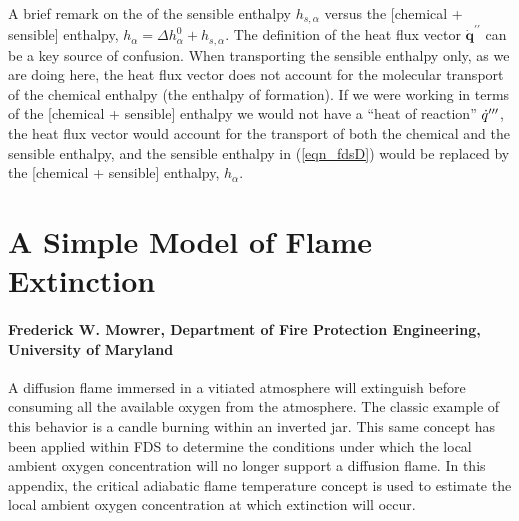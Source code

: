 A brief remark on the of the sensible enthalpy $h_{s,\alpha}$ versus the [chemical + sensible] enthalpy, $h_\alpha = \Delta h_\alpha^0 + h_{s,\alpha}$.
The definition of the heat flux vector $\dot{\mathbf{q}}^{\prime\prime}$ can be a key source of confusion.
When transporting the sensible enthalpy only, as we are doing here, the heat flux vector does not account for the molecular transport of the
chemical enthalpy (the enthalpy of formation).  If we were working in terms of the [chemical + sensible] enthalpy we would not have
a ``heat of reaction'' $\dot{q}^{{\prime\prime\prime}}$, the heat flux vector would account for the transport of both the chemical and the sensible enthalpy,
and the sensible enthalpy in (\ref{eqn_fdsD}) would be replaced by the [chemical + sensible] enthalpy, $h_{\alpha}$.






\chapter{A Simple Model of Flame Extinction}

\subsubsection{Frederick W. Mowrer, Department of Fire Protection Engineering, University of Maryland}

\label{mowrer_model}


A diffusion flame immersed in a vitiated atmosphere will extinguish before consuming all the
available oxygen from the atmosphere.  The classic example of this behavior is a candle burning
within an inverted jar.  This same concept has been applied within FDS
to determine the conditions under which the local ambient oxygen concentration will no longer
support a diffusion flame.  In this appendix, the critical adiabatic flame temperature
concept is used to estimate the local ambient oxygen concentration at which extinction will
occur.

